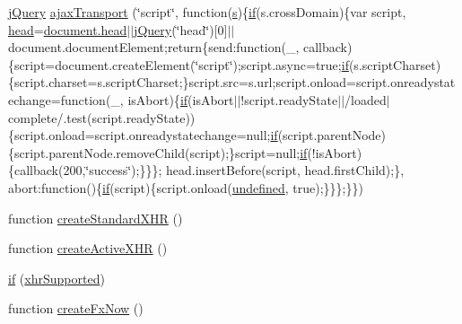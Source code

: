 \begin{DoxyCompactItemize}
\item 
\hyperlink{_scripts_2jquery-1_810_82_8js_a41c2e1bff4a6b292938143764e31d789}{j\+Query} \hyperlink{_scripts_2jquery-1_810_82_8js_ade7f5e1842214b9c2ed0c201344a110c}{ajax\+Transport} (\char`\"{}script\char`\"{}, function(\hyperlink{_scripts_2respond_8min_8js_ad9a7d92cb87932d25187fdec3ba1b621}{s})\{\hyperlink{_scripts_2respond_8min_8js_a93851d60dd037a83509a1757b9ee7b66}{if}(s.\+cross\+Domain)\{var script, \hyperlink{_scripts_2respond_8js_aeb4eed5f5e638eafa138655bd16be507}{head}=\hyperlink{_scripts_2respond_8js_aeb4eed5f5e638eafa138655bd16be507}{document.\+head}$\vert$$\vert$\hyperlink{_scripts_2jquery-1_810_82_8js_a41c2e1bff4a6b292938143764e31d789}{j\+Query}(\char`\"{}head\char`\"{})\mbox{[}0\mbox{]}$\vert$$\vert$document.\+document\+Element;return\{send\+:function(\+\_\+, callback)\{script=document.\+create\+Element(\char`\"{}script\char`\"{});script.\+async=true;\hyperlink{_scripts_2respond_8min_8js_a93851d60dd037a83509a1757b9ee7b66}{if}(s.\+script\+Charset)\{script.\+charset=s.\+script\+Charset;\}script.\+src=s.\+url;script.\+onload=script.\+onreadystatechange=function(\+\_\+, is\+Abort)\{\hyperlink{_scripts_2respond_8min_8js_a93851d60dd037a83509a1757b9ee7b66}{if}(is\+Abort$\vert$$\vert$!script.\+ready\+State$\vert$$\vert$/loaded$\vert$complete/.test(script.\+ready\+State))\{script.\+onload=script.\+onreadystatechange=null;\hyperlink{_scripts_2respond_8min_8js_a93851d60dd037a83509a1757b9ee7b66}{if}(script.\+parent\+Node)\{script.\+parent\+Node.\+remove\+Child(script);\}script=null;\hyperlink{_scripts_2respond_8min_8js_a93851d60dd037a83509a1757b9ee7b66}{if}(!is\+Abort)\{callback(200,\char`\"{}success\char`\"{});\}\}\};   head.\+insert\+Before(script, head.\+first\+Child);\}, abort\+:function()\{\hyperlink{_scripts_2respond_8min_8js_a93851d60dd037a83509a1757b9ee7b66}{if}(script)\{script.\+onload(\hyperlink{_scripts_2jquery-1_810_82_8js_a08113a236cc18d2a9d5ce27e638012be}{undefined}, true);\}\}\};\}\})
\item 
function \hyperlink{_scripts_2jquery-1_810_82_8js_acea019a8b67e4d114deb75d1e0b3474a}{create\+Standard\+X\+HR} ()
\item 
function \hyperlink{_scripts_2jquery-1_810_82_8js_a54bf63f1b5f905292db45a1d6a9dc300}{create\+Active\+X\+HR} ()
\item 
\hyperlink{_scripts_2jquery-1_810_82_8js_ae2dd433d7bb020adf83db5351a0671e1}{if} (\hyperlink{_scripts_2jquery-1_810_82_8js_afd7e72f2f357a5a8b17e46776a6283eb}{xhr\+Supported})
\item 
function \hyperlink{_scripts_2jquery-1_810_82_8js_a3c7bcef859b0811abb1dbf890c6cc635}{create\+Fx\+Now} ()

\end{DoxyCompactItemize}
